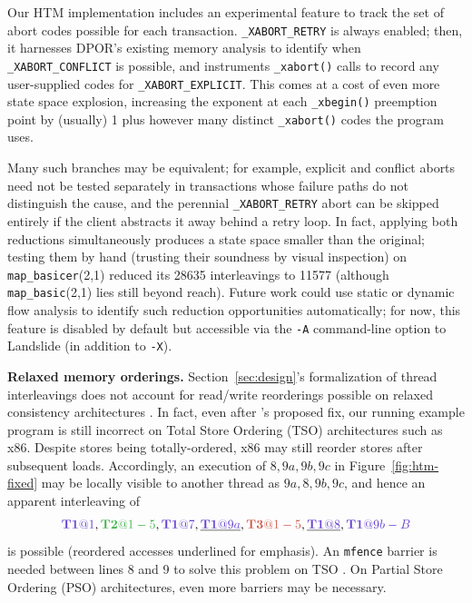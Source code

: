 \documentclass[10pt]{sigplanconf}
\begin{document}
Our HTM implementation includes an experimental feature
to track the set of abort codes possible for each transaction.
{\tt \_XABORT\_RETRY} is always enabled;
then,
it harnesses DPOR's existing memory analysis to identify when {\tt \_XABORT\_CONFLICT} is possible,
and instruments {\tt \_xabort()} calls to record any user-supplied codes for {\tt \_XABORT\_EXPLICIT}.
This comes at a cost of even more state space explosion,
increasing the exponent at each {\tt \_xbegin()} preemption point
by (usually) 1 plus however many distinct {\tt \_xabort()} codes the program uses.

Many such branches may be equivalent;
for example,
explicit and conflict aborts need not be tested separately in transactions
whose failure paths do not distinguish the cause,
and the perennial {\tt \_XABORT\_RETRY} abort can be skipped entirely
if the client abstracts it away behind a retry loop.
In fact, applying both reductions simultaneously
produces a state space smaller than the original;
testing them by hand (trusting their soundness by visual inspection)
on {\tt map\_basicer}(2,1) reduced its 28635 interleavings to 11577
(although {\tt map\_basic}(2,1) lies still beyond reach).
%
%
Future work could use static or dynamic flow analysis to
identify such reduction opportunities automatically;
for now, this feature is disabled by default but accessible via the {\tt -A} command-line option
to Landslide (in addition to {\tt -X}).

{\bf Relaxed memory orderings.}
Section~\ref{sec:design}'s formalization of thread interleavings does not account for read/write reorderings
possible on relaxed consistency architectures \cite{memory-consistency-models}.
In fact,
even after \cite{htm-mario}'s proposed fix,
our running example program is still incorrect on Total Store Ordering (TSO) architectures such as x86.
Despite stores being totally-ordered, x86 may still reorder stores after subsequent loads.
Accordingly, an execution of $8,9a,9b,9c$ in Figure~\ref{fig:htm-fixed}
may be locally visible to another thread as $9a,8,9b,9c$,
and hence an apparent interleaving of
\[
	\tiat{1},\tjat{1-5},\tiat{7},\underline{\tiat{9a}},\tkat{1-5},\underline{\tiat{8}},\tiat{9b-B}
\]
is possible
(reordered accesses underlined for emphasis).
An {\tt mfence} barrier is needed between lines 8 and 9 to solve this problem on TSO \cite{tsx-need-barrier}.
On Partial Store Ordering (PSO) architectures, even more barriers may be necessary.
\end{document}
